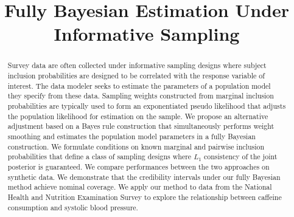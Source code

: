 \documentclass[]{imsart}
\begin{document}
\begin{frontmatter}
\title{Fully Bayesian Estimation Under Informative Sampling}


\begin{abstract}
Survey data are often collected under informative sampling designs where subject inclusion probabilities are designed to be correlated with the response variable of interest. The data modeler seeks to estimate the parameters of a population model they specify from these data.  Sampling weights constructed from marginal inclusion probabilities are typically used to form an exponentiated pseudo likelihood that adjusts the population likelihood for estimation on the sample. We propose an alternative adjustment based on a Bayes rule construction that simultaneously performs weight smoothing and estimates the population model parameters in a fully Bayesian construction. We formulate conditions on known marginal and pairwise inclusion probabilities that define a class of sampling designs where $L_{1}$ consistency of the joint posterior is guaranteed. We compare performances between the two approaches on synthetic data. We demonstrate that the credibility intervals under our fully Bayesian method achieve nominal coverage.
We apply our method to data from the National Health and Nutrition Examination Survey to explore the relationship between caffeine consumption and systolic blood pressure.
\end{abstract}


\end{frontmatter}
\end{document}
